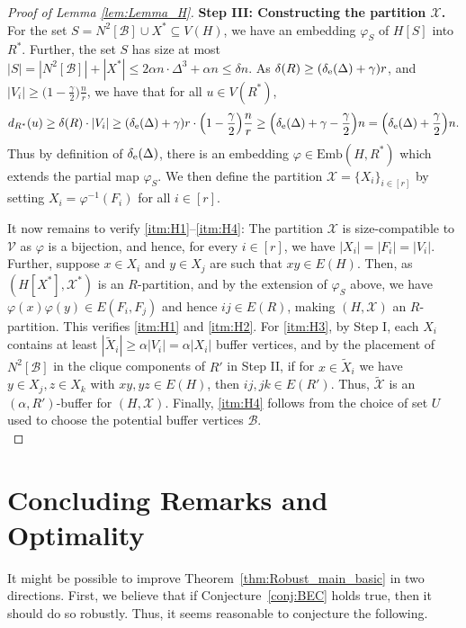 \documentclass[final]{article}
\theoremstyle{definition}
\newcommand{\Emb}{\mathrm{Emb}}
\newcommand{\exth}{\delta_{\rm e}(\Delta)}
\let\tilde\widetilde
\begin{document}
\begin{proof}[Proof of Lemma \ref{lem:Lemma_H}]
    \textbf{Step III: Constructing the partition $\mathcal{X}$.} For the set $S = N^2[\mathcal{B}] \cup X^* \subseteq V(H)$, we have an embedding $\varphi_S$ of $H[S]$ into $R^*$. Further, the set $S$ has size at most $|S| = |N^2[\mathcal{B}]| + |X^*| \leq 2\alpha n \cdot \Delta^3 + \alpha n \leq \delta n $. As  $\delta(R) \geq (\exth + \gamma)r$, and $|V_i| \geq \bigl(1 - \frac{\gamma}{2}\bigr)\frac{n}{r}$, we have that for all $u \in V(R^*)$, 
    $$ d_{R^*}(u) \geq \delta(R) \cdot |V_i| \geq (\exth + \gamma)r \cdot \Bigl(1 - \frac{\gamma}{2}\Bigr)\frac{n}{r} \geq \Bigl(\exth + \gamma - \frac{\gamma}{2}\Bigr) n = \Bigl(\exth + \frac{\gamma}{2}\Bigr) n.$$
    Thus by definition of $\exth$, there is an embedding $\varphi \in \Emb(H, R^*)$ which extends the partial map $\varphi_S$. We then define the partition $\mathcal{X} = \{X_i\}_{i \in [r]}$ by setting $X_i = \varphi^{-1}(F_i)$ for all $i \in [r]$. 
    
    It now remains to verify \ref{itm:H1}--\ref{itm:H4}: The partition $\mathcal{X}$ is size-compatible to $\mathcal{V}$ as $\varphi$ is a bijection, and hence, for every $i \in [r]$, we have $|X_i| = |F_i| = |V_i|$. Further, suppose $x \in X_i$ and $y \in X_j$ are such that $xy \in E(H)$. Then, as $(H[X^*], \mathcal{X}^*)$ is an $R$-partition, and by the extension of $\varphi_S$ above, we have $\varphi(x)\varphi(y) \in E(F_i, F_j)$ and hence $ij \in E(R)$, making $(H, \mathcal{X})$ an $R$-partition. This verifies \ref{itm:H1} and \ref{itm:H2}. For \ref{itm:H3}, by Step I, each $X_i$ contains at least $|\tilde{X}_i| \geq \alpha|V_i| = \alpha|X_i|$ buffer vertices, and by the placement of $N^2[\mathcal{B}]$ in the clique components of $R'$ in Step II, if for $x \in \tilde{X}_i$ we have $y \in X_j, z \in X_k$ with $xy, yz \in E(H)$, then $ij, jk \in E(R')$. Thus, $\tilde{\mathcal{X}}$ is an $(\alpha, R')$-buffer for $(H, \mathcal{X})$. Finally, \ref{itm:H4} follows from the choice of set $U$ used to choose the potential buffer vertices $\mathcal{B}$.\\ 
\end{proof}

\section{Concluding Remarks and Optimality}
\label{sec:conclusion}

It might be possible to improve Theorem~\ref{thm:Robust_main_basic} in two
directions. First, we believe that if Conjecture~\ref{conj:BEC}
holds true, then it should do so robustly. Thus, it seems reasonable
to conjecture the following.
\end{document}
